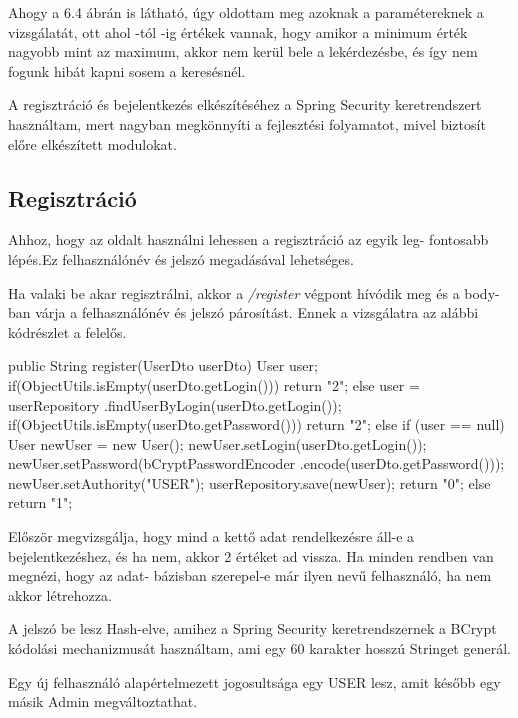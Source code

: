Ahogy a 6.4 ábrán is látható, úgy oldottam meg azoknak a paramétereknek a vizsgálatát, ott ahol -tól -ig értékek vannak, hogy amikor a minimum érték nagyobb mint az maximum, akkor nem kerül bele a lekérdezésbe, és így nem fogunk hibát kapni sosem a keresésnél.

A regisztráció és bejelentkezés elkészítéséhez a Spring Security keretrendszert \cite{SpringSecurity} használtam, mert nagyban megkönnyíti a fejlesztési folyamatot, mivel biztosít előre elkészített modulokat.

\subsection{Regisztráció}
Ahhoz, hogy az oldalt használni lehessen  a regisztráció az egyik leg-
fontosabb lépés.Ez felhasználónév és  jelszó megadásával lehetséges. 

Ha valaki be akar regisztrálni, akkor a  \textit{/register} végpont hívódik meg és a body-ban várja a felhasználónév és jelszó párosítást. Ennek a vizsgálatra az alábbi kódrészlet a felelős.

\begin{java}
 public String register(UserDto userDto) {
     User user;
     if(ObjectUtils.isEmpty(userDto.getLogin())){
       return "2";
     } else{
         user = userRepository
           .findUserByLogin(userDto.getLogin());
     }
     if(ObjectUtils.isEmpty(userDto.getPassword())) {
       return "2";
       }else {
          if (user == null) {
             User newUser = new User();
             newUser.setLogin(userDto.getLogin());
             newUser.setPassword(bCryptPasswordEncoder
                        .encode(userDto.getPassword()));
             newUser.setAuthority("USER");
             userRepository.save(newUser);
             return "0";
          } else {
             return "1";
            }
        }
    }
\end{java}

Először megvizsgálja, hogy mind a kettő adat rendelkezésre áll-e a bejelentkezéshez, és ha nem, akkor 2 értéket ad vissza. Ha minden rendben van megnézi, hogy az adat-
bázisban szerepel-e már ilyen nevű felhasználó, ha nem akkor létrehozza.


A jelszó be lesz Hash-elve, amihez a Spring Security  keretrendszernek a BCrypt kódolási mechanizmusát használtam, ami egy 60 karakter hosszú Stringet generál.

Egy új felhasználó alapértelmezett jogosultsága egy USER lesz, amit később egy másik Admin megváltoztathat.

